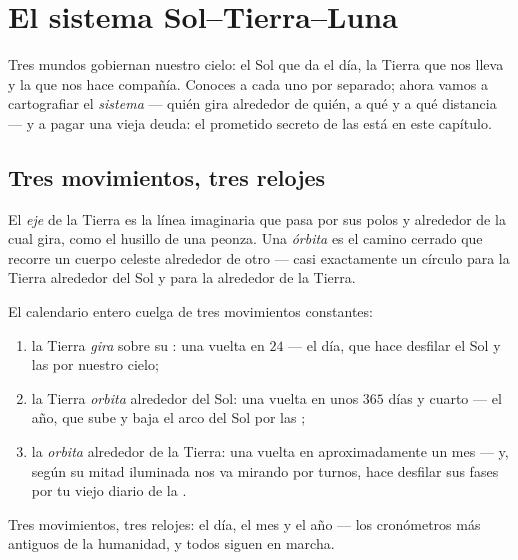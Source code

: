 \chapter{El sistema Sol--Tierra--Luna}\label{ch:g6:sun-earth-moon}

Tres mundos gobiernan nuestro cielo: el Sol que da el día, la Tierra
que nos lleva y la  que nos hace compañía. Conoces a cada uno
por separado; ahora vamos a cartografiar el \emph{sistema} --- quién
gira alrededor de quién, a qué  y a qué distancia --- y a
pagar una vieja deuda: el prometido secreto de las  está
en este capítulo.

\section{Tres movimientos, tres relojes}

\begin{definition}\label{def:g6:sun-earth-moon:axisorbit}
El \emph{eje} de la Tierra es la línea imaginaria que pasa
por sus polos y alrededor de la cual gira, como el husillo de una
peonza. Una \emph{órbita} es el camino cerrado que
recorre un cuerpo celeste alrededor de otro --- casi exactamente un
círculo para la Tierra alrededor del Sol y para la  alrededor de
la Tierra.
\end{definition}

\begin{proposition}\label{prop:g6:sun-earth-moon:motions}
El calendario entero cuelga de tres movimientos constantes:
\begin{enumerate}
  \item la Tierra \emph{gira} sobre su : una vuelta en $24$
         --- el día, que hace desfilar el Sol y las
         por nuestro cielo;
  \item la Tierra \emph{orbita} alrededor del Sol: una vuelta en
        unos $365$ días y cuarto --- el año, que sube y baja el arco
        del Sol por las ;
  \item la  \emph{orbita} alrededor de la Tierra: una
        vuelta en aproximadamente un mes --- y, según su mitad
        iluminada nos va mirando por turnos, hace desfilar sus fases
        por tu viejo diario de la .
\end{enumerate}
Tres movimientos, tres relojes: el día, el mes y el año --- los
cronómetros más antiguos de la humanidad, y todos siguen en marcha.
\end{proposition}

